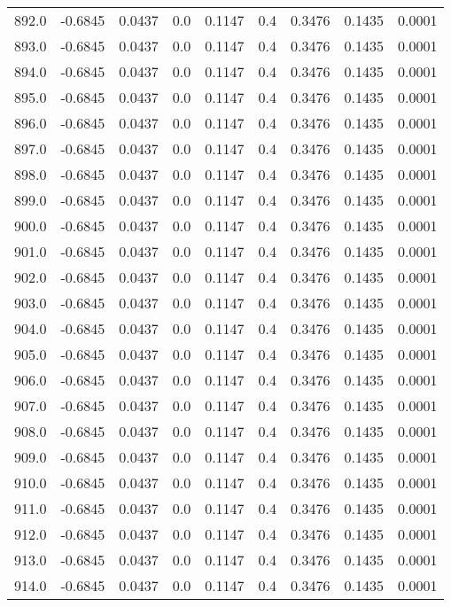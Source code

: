 \begin{longtable}{lrrrrrrrr}
892.0 & -0.6845 & 0.0437 & 0.0 & 0.1147 & 0.4 & 0.3476 & 0.1435 & 0.0001 \\
893.0 & -0.6845 & 0.0437 & 0.0 & 0.1147 & 0.4 & 0.3476 & 0.1435 & 0.0001 \\
894.0 & -0.6845 & 0.0437 & 0.0 & 0.1147 & 0.4 & 0.3476 & 0.1435 & 0.0001 \\
895.0 & -0.6845 & 0.0437 & 0.0 & 0.1147 & 0.4 & 0.3476 & 0.1435 & 0.0001 \\
896.0 & -0.6845 & 0.0437 & 0.0 & 0.1147 & 0.4 & 0.3476 & 0.1435 & 0.0001 \\
897.0 & -0.6845 & 0.0437 & 0.0 & 0.1147 & 0.4 & 0.3476 & 0.1435 & 0.0001 \\
898.0 & -0.6845 & 0.0437 & 0.0 & 0.1147 & 0.4 & 0.3476 & 0.1435 & 0.0001 \\
899.0 & -0.6845 & 0.0437 & 0.0 & 0.1147 & 0.4 & 0.3476 & 0.1435 & 0.0001 \\
900.0 & -0.6845 & 0.0437 & 0.0 & 0.1147 & 0.4 & 0.3476 & 0.1435 & 0.0001 \\
901.0 & -0.6845 & 0.0437 & 0.0 & 0.1147 & 0.4 & 0.3476 & 0.1435 & 0.0001 \\
902.0 & -0.6845 & 0.0437 & 0.0 & 0.1147 & 0.4 & 0.3476 & 0.1435 & 0.0001 \\
903.0 & -0.6845 & 0.0437 & 0.0 & 0.1147 & 0.4 & 0.3476 & 0.1435 & 0.0001 \\
904.0 & -0.6845 & 0.0437 & 0.0 & 0.1147 & 0.4 & 0.3476 & 0.1435 & 0.0001 \\
905.0 & -0.6845 & 0.0437 & 0.0 & 0.1147 & 0.4 & 0.3476 & 0.1435 & 0.0001 \\
906.0 & -0.6845 & 0.0437 & 0.0 & 0.1147 & 0.4 & 0.3476 & 0.1435 & 0.0001 \\
907.0 & -0.6845 & 0.0437 & 0.0 & 0.1147 & 0.4 & 0.3476 & 0.1435 & 0.0001 \\
908.0 & -0.6845 & 0.0437 & 0.0 & 0.1147 & 0.4 & 0.3476 & 0.1435 & 0.0001 \\
909.0 & -0.6845 & 0.0437 & 0.0 & 0.1147 & 0.4 & 0.3476 & 0.1435 & 0.0001 \\
910.0 & -0.6845 & 0.0437 & 0.0 & 0.1147 & 0.4 & 0.3476 & 0.1435 & 0.0001 \\
911.0 & -0.6845 & 0.0437 & 0.0 & 0.1147 & 0.4 & 0.3476 & 0.1435 & 0.0001 \\
912.0 & -0.6845 & 0.0437 & 0.0 & 0.1147 & 0.4 & 0.3476 & 0.1435 & 0.0001 \\
913.0 & -0.6845 & 0.0437 & 0.0 & 0.1147 & 0.4 & 0.3476 & 0.1435 & 0.0001 \\
914.0 & -0.6845 & 0.0437 & 0.0 & 0.1147 & 0.4 & 0.3476 & 0.1435 & 0.0001 \\

\end{longtable}
